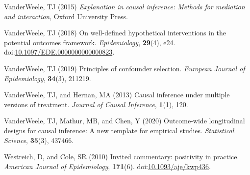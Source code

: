 \documentclass[
  singlecolumn]{article}
\newlength{\cslhangindent}
\newenvironment{CSLReferences}[2] %
 {\begin{list}{}{%
  \setlength{\itemindent}{0pt}
  \setlength{\leftmargin}{0pt}
  \setlength{\parsep}{0pt}
  \ifodd #1
   \setlength{\leftmargin}{\cslhangindent}
   \setlength{\itemindent}{-1\cslhangindent}
  \fi
  \setlength{\itemsep}{#2\baselineskip}}}
 {\end{list}}
\begin{document}
\begin{CSLReferences}{1}{0}
VanderWeele, TJ (2015) \emph{Explanation in causal inference: Methods
for mediation and interaction}, Oxford University Press.

VanderWeele, TJ (2018) On well-defined hypothetical interventions in the
potential outcomes framework. \emph{Epidemiology}, \textbf{29}(4), e24.
doi:\href{https://doi.org/10.1097/EDE.0000000000000823}{10.1097/EDE.0000000000000823}.

VanderWeele, TJ (2019) Principles of confounder selection.
\emph{European Journal of Epidemiology}, \textbf{34}(3), 211219.

VanderWeele, TJ, and Hernan, MA (2013) Causal inference under multiple
versions of treatment. \emph{Journal of Causal Inference},
\textbf{1}(1), 120.

VanderWeele, TJ, Mathur, MB, and Chen, Y (2020) Outcome-wide
longitudinal designs for causal inference: A new template for empirical
studies. \emph{Statistical Science}, \textbf{35}(3), 437466.

Westreich, D, and Cole, SR (2010) Invited commentary: positivity in
practice. \emph{American Journal of Epidemiology}, \textbf{171}(6).
doi:\href{https://doi.org/10.1093/aje/kwp436}{10.1093/aje/kwp436}.

\end{CSLReferences}
\end{document}
